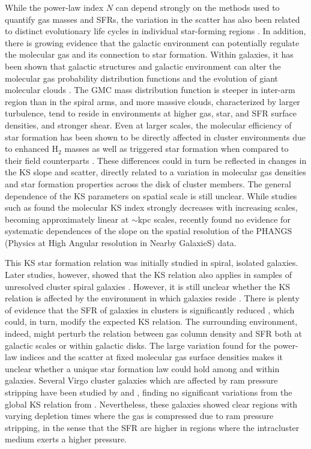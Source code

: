 \documentclass[longauth]{aa}
\begin{document}
While the power-law index $N$ can depend strongly on the methods used to quantify gas masses and SFRs, the variation in the scatter has also been related to distinct evolutionary life cycles in individual star-forming regions \citep[e.g.,][]{Schruba2010}. In addition, there is growing evidence that the galactic environment can potentially regulate the molecular gas and its connection to star formation. Within galaxies, it has been shown that galactic structures and galactic environment can alter the molecular gas probability distribution functions and the evolution of giant molecular clouds \citep[e.g.,][]{Hughes2013,Colombo2014,Sun2020,Meidt2021,Sun2022}. The GMC mass distribution function is steeper in inter-arm region than in the spiral arms, and more massive clouds, characterized by larger turbulence, tend to reside in environments at higher gas, star, and SFR surface densities, and stronger shear. Even at larger scales, the molecular efficiency of star formation has been shown to be directly affected in cluster environments due to enhanced H$_2$ masses as well as triggered star formation when compared to their field counterparts \citep[e.g.,][]{Mok2017}. These differences could in turn be reflected in changes in the KS slope and scatter, directly related to a variation in molecular gas densities and star formation properties across the disk of cluster members. The general dependence of the KS parameters on spatial scale is still unclear. While studies such as \citet{Williams2018} found the molecular KS index strongly decreases with increasing scales, becoming approximately linear at $\sim$kpc scales, \citet{Pessa2021} recently found no evidence for systematic dependences of the slope on the spatial resolution of the PHANGS (Physics at High Angular resolution in Nearby GalaxieS) data.

This KS star formation relation was initially studied in spiral, isolated galaxies. Later studies, however, showed that the KS relation also applies in samples of unresolved cluster spiral galaxies \citep{Fumagalli2008,Vollmer2012}. However, it is still unclear whether the KS relation is affected by the environment in which galaxies reside \citep[e.g.,][]{Boquien2011,Lizee2021,Vollmer2021}. There is plenty of evidence that the SFR of galaxies in clusters is significantly reduced \citep[see e.g.,][and references therein]{Boselli2022}, which could, in turn, modify the expected KS relation. The surrounding environment, indeed, might perturb the relation between gas column density and SFR both at galactic scales or within galactic disks. The large variation found for the power-law indices and the scatter at fixed molecular gas surface densities makes it unclear whether a unique star formation law could hold among and within galaxies. Several Virgo cluster galaxies which are affected by ram pressure stripping have been studied by \citep{Nehlig2016} and \citet{Lee2017}, finding no significant variations from the global KS relation from \citet{Kennicutt1998}. Nevertheless, these galaxies showed clear regions with varying depletion times where the gas is compressed due to ram pressure stripping, in the sense that the SFR are higher in regions where the intracluster medium exerts a higher pressure.
\end{document}
